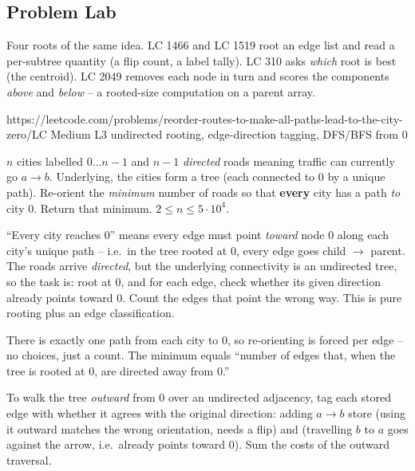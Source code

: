 \subsection{Problem Lab}

Four roots of the same idea. LC 1466 and LC 1519 root an edge list and read a
per-subtree quantity (a flip count, a label tally). LC 310 asks \emph{which} root is best
(the centroid). LC 2049 removes each node in turn and scores the components \emph{above}
and \emph{below} -- a rooted-size computation on a parent array.

  {https://leetcode.com/problems/reorder-routes-to-make-all-paths-lead-to-the-city-zero/}{LC Medium L3}
  {undirected rooting, edge-direction tagging, DFS/BFS from 0}

\begin{problemstatement}
$n$ cities labelled $0\dots n-1$ and $n-1$ \emph{directed} roads  meaning traffic can currently go $a \to b$. Underlying, the cities form a tree
(each connected to $0$ by a unique path). Re-orient the \emph{minimum} number of roads so
that \textbf{every} city has a path \emph{to} city $0$. Return that minimum.
$2 \le n \le 5\cdot10^4$.
\end{problemstatement}

``Every city reaches $0$'' means every edge must point \emph{toward} node $0$ along each
city's unique path -- i.e.\ in the tree rooted at $0$, every edge goes child $\to$ parent.
The roads arrive \emph{directed}, but the underlying connectivity is an undirected tree,
so the task is: root at $0$, and for each edge, check whether its given direction already
points toward $0$. Count the edges that point the wrong way. This is pure rooting plus an
edge classification.

\begin{observation}
There is exactly one path from each city to $0$, so re-orienting is forced per edge --
no choices, just a count. The minimum equals ``number of edges that, when the tree is
rooted at $0$, are directed away from $0$.''
\end{observation}
\begin{observation}
To walk the tree \emph{outward} from $0$ over an undirected adjacency, tag each stored
edge with whether it agrees with the original direction: adding $a\to b$ store
 (using it outward matches the wrong orientation, needs a
flip) and  (travelling $b$ to $a$ goes against the arrow, i.e.\
already points toward $0$). Sum the costs of the outward traversal.
\end{observation}

